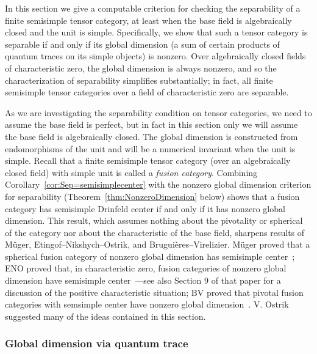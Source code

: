 \documentclass{amsart}
\begin{document}
In this section we give a computable criterion for checking the separability of a finite semisimple tensor category, at least when the base field is algebraically closed and the unit is simple.  Specifically, we show that such a tensor category is separable if and only if its global dimension (a sum of certain products of quantum traces on its simple objects) is nonzero.  Over algebraically closed fields of characteristic zero, the global dimension is always nonzero, and so the characterization of separability simplifies substantially; in fact, all finite semisimple tensor categories over a field of characteristic zero are separable.

As we are investigating the separability condition on tensor categories, we need to assume the base field is perfect, but in fact in this section only we will assume the base field is algebraically closed.  The global dimension is constructed from endomorphisms of the unit and will be a numerical invariant when the unit is simple.  Recall that a finite semisimple tensor category (over an algebraically closed field) with simple unit is called a \emph{fusion category}.  Combining Corollary~\ref{cor:Sep=semisimplecenter} with the nonzero global dimension criterion for separability (Theorem~\ref{thm:NonzeroDimension} below) shows that a fusion category has semisimple Drinfeld center if and only if it has nonzero global dimension.  This result, which assumes nothing about the pivotality or spherical of the category nor about the characteristic of the base field, sharpens results of M\"uger, Etingof--Nikshych--Ostrik, and Brugui\`eres--Virelizier.  M\"uger proved that a spherical fusion category of nonzero global dimension has semisimple center~\cite[Thm. 3.16]{MR1966525}; ENO proved that, in characteristic zero, fusion categories of nonzero global dimension have semisimple center~\cite[Thm. 2.15]{MR2183279}---see also Section 9 of that paper for a discussion of the positive characteristic situation; BV proved that pivotal fusion categories with semsimple center have nonzero global dimension~\cite{MR3079759}.  V. Ostrik suggested many of the ideas contained in this section.


\subsubsection{Global dimension via quantum trace} \label{sec:gdim}
\end{document}
